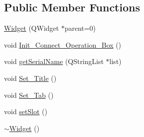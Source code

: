 \subsection*{Public Member Functions}
\begin{DoxyCompactItemize}
\item 
\mbox{\hyperlink{class_widget_a29531c7f141e461322981b3b579d4590}{Widget}} (Q\+Widget $\ast$parent=0)
\item 
void \mbox{\hyperlink{class_widget_a73ede9961382ea942361e9845fa11aa0}{Init\+\_\+\+Connect\+\_\+\+Operation\+\_\+\+Box}} ()
\item 
void \mbox{\hyperlink{class_widget_afb97de9294ffdbb2c64ed1f96aea9261}{get\+Serial\+Name}} (Q\+String\+List $\ast$list)
\item 
void \mbox{\hyperlink{class_widget_a5323ca5c4124c0d187a2f1398ef48844}{Set\+\_\+\+Title}} ()
\item 
void \mbox{\hyperlink{class_widget_ac611086a6f74fe7bab712f23ab7126d8}{Set\+\_\+\+Tab}} ()
\item 
void \mbox{\hyperlink{class_widget_ac60c5a62bc3197fbc7ade8f40df70c70}{set\+Slot}} ()
\item 
\mbox{\hyperlink{class_widget_aa24f66bcbaaec6d458b0980e8c8eae65}{$\sim$\+Widget}} ()
\end{DoxyCompactItemize}

